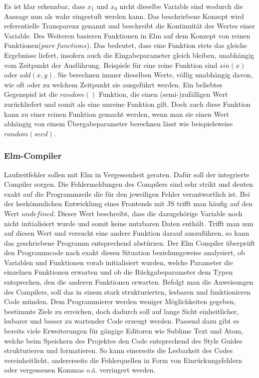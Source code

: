 Es ist klar erkennbar, dass $x_1$ und $x_0$ nicht dieselbe Variable sind wodurch die Aussage nun als wahr eingestuft werden kann. Das beschriebene Konzept wird referentielle Transparenz genannt und beschreibt die Kontinuität des Wertes einer Variable.
Des Weiteren basieren Funktionen in Elm auf dem Konzept von reinen Funktionen($pure\,functions$). Das bedeutet, dass eine Funktion stets das gleiche Ergebnisse liefert, insofern auch die Eingabeparameter gleich bleiben, unabhängig vom Zeitpunkt der Ausführung. Beispiele für eine reine Funktion sind $sin(x)$ oder $add(x, y)$. Sie berechnen immer dieselben Werte, völlig unabhängig davon, wie oft oder zu welchem Zeitpunkt sie ausgeführt werden. Ein beliebtes Gegenspiel ist die $random()$ Funktion, die einen (semi-)zufälligen Wert zurückliefert und somit als eine unreine Funktion gilt. Doch auch diese Funktion kann zu einer reinen Funktion gemacht werden, wenn man sie einen Wert abhängig von einem Übergabeparameter berechnen lässt wie beispielsweise $random(seed)$.

\subsubsection{Elm-Compiler}
\label{sec:Elm-Compiler}
Laufzeitfehler sollen mit Elm in Vergessenheit geraten. Dafür soll der integrierte Compiler sorgen. Die Fehlermeldungen des Compilers sind sehr strikt und deuten exakt auf die Programmzeile die für den jeweiligen Fehler verantwortlich ist. Bei der herkömmlichen Entwicklung eines Frontends mit \ac{JS} trifft man häufig auf den Wert $undefined$. Dieser Wert beschreibt, dass die dazugehörige Variable noch nicht initialisiert wurde und somit keine nutzbaren Daten enthält. Trifft man nun auf diesen Wert und versucht eine andere Funktion darauf auszuführen, so kann das geschriebene Programm entsprechend abstürzen. Der Elm Compiler überprüft den Programmcode nach exakt diesen Situation beziehungsweise analysiert, ob Variablen und Funktionen vorab initialisiert wurden, welche Parameter die einzelnen Funktionen erwarten und ob die Rückgabeparameter dem Typen entsprechen, den die anderen Funktionen erwarten. Befolgt man die Anweisungen des Compilers, soll das in einem stark strukturierten, lesbaren und funktionieren Code münden.
Dem Programmierer werden weniger Möglichkeiten gegeben, bestimmte Ziele zu erreichen, doch dadurch soll auf lange Sicht einheitlicher, lesbarer und besser zu wartender Code erzeugt werden. Passend dazu gibt es bereits viele Erweiterungen für gängige Editoren wie Sublime Text und Atom, welche beim Speichern des Projektes den Code entsprechend des Style Guides strukturieren und formatieren. So kann einerseits die Lesbarkeit des Codes vereinheitlicht, andererseits die Fehlerquellen in Form von Einrückungsfehlern oder vergessenen Kommas o.ä. verringert werden.

